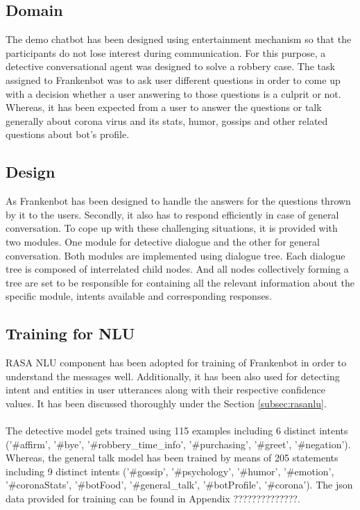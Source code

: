 \subsection{Domain}
The demo chatbot has been designed using entertainment mechanism so that the participants do not lose interest during communication. For this purpose, a detective conversational agent was designed to solve a robbery case. The task assigned to Frankenbot was to ask user different questions in order to come up with a decision whether a user answering to those questions is a culprit or not. Whereas, it has been expected from a user to answer the questions or talk generally about corona virus and its stats, humor, gossips and other related questions about bot's profile.

\subsection{Design}
As Frankenbot has been designed to handle the answers for the questions thrown by it to the users. Secondly, it also has to respond efficiently in case of general conversation. To cope up with these challenging situations, it is provided with two modules. One module for detective dialogue and the other for general conversation. Both modules are implemented using dialogue tree. Each dialogue tree is composed of interrelated child nodes. And all nodes collectively forming a tree are set to be responsible for containing all the relevant information about the specific module, intents available and corresponding responses. 

\subsection{Training for NLU \label{sec:expchatbot}}
RASA NLU component has been adopted for training of Frankenbot in order to understand the messages well. Additionally, it has been also used for detecting intent and entities in user utterances along with their respective confidence values.  It has been discussed thoroughly under the Section \ref{subsec:rasanlu}.  
\\~\\
The detective model gets trained using 115 examples including 6 distinct intents ('\#affirm', '\#bye', '\#robbery\_time\_info', '\#purchasing', '\#greet', '\#negation'). Whereas, the general talk model has been trained by means of 205 statements including 9 distinct intents ('\#gossip', '\#psychology', '\#humor', '\#emotion', '\#coronaStats', '\#botFood', '\#general\_talk', '\#botProfile', '\#corona'). The json data provided for training can be found in Appendix ??????????????.  

